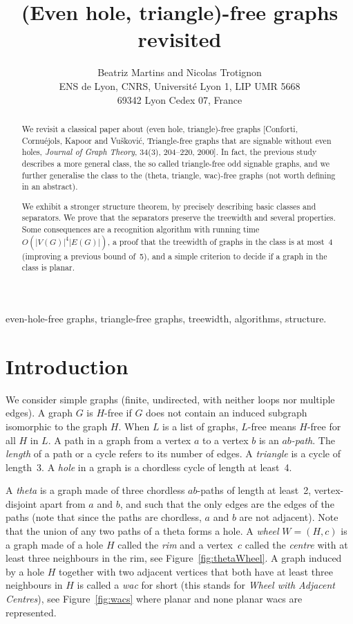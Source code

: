 \documentclass[11pt]{article}
\title{(Even hole, triangle)-free graphs revisited}
\author{Beatriz Martins and Nicolas Trotignon%
\\{ENS de Lyon, CNRS, Université Lyon 1, LIP UMR 5668\\69342 Lyon Cedex 07, France}}
\begin{document}
\maketitle

\begin{abstract}
 We revisit a classical paper about (even hole, triangle)-free graphs  [Conforti, Cornu\'ejols, Kapoor and Vu\v skovi\'c, Triangle-free graphs that are signable without even holes, \textit{Journal of Graph Theory}, 34(3), 204--220, 2000]. 
 In fact, the previous study describes a more general class, the so called triangle-free odd signable graphs, and we further generalise the class to the (theta, triangle, wac)-free graphs (not worth defining in an abstract).  
 
 We exhibit a stronger structure theorem, by precisely describing basic classes and separators.  We prove that the separators preserve the treewidth and several properties.  
 Some consequences are a recognition algorithm with running time $O(|V(G)|^4|E(G)|)$, a proof that  the treewidth of graphs in the class is at most~4 (improving a previous bound of~5), and a simple criterion to decide if a graph in the class is planar. 
\end{abstract}


 even-hole-free graphs, triangle-free graphs, treewidth, algorithms, structure.


\section{Introduction}
\label{sec:intro}

We consider simple graphs (finite, undirected, with neither loops nor multiple edges). A graph $G$ is $H$-free if $G$ does not contain an induced subgraph isomorphic to the graph $H$.  When $L$ is a list of graphs, $L$-free means $H$-free for all $H$ in $L$.  A path in a graph from a vertex $a$ to a vertex $b$ is an \emph{$ab$-path}. The \emph{length} of a path or a cycle refers to its number of edges. A \emph{triangle} is a cycle of length~3. A \emph{hole} in a graph is a chordless cycle of length at least~4. 

A \emph{theta} is a graph made of three chordless $ab$-paths of length at least~2, vertex-disjoint apart from $a$ and $b$, and such that the only edges are the edges of the paths (note that since the paths are chordless, $a$ and $b$ are not adjacent).  
Note that the union of any two paths of a theta forms a hole. 
A \emph{wheel} $W = (H, c)$ is a graph made of a hole $H$ called the
\emph{rim} and a vertex~$c$ called the \emph{centre} with at least
three neighbours in the rim, see Figure~\ref{fig:thetaWheel}.  
A graph induced by a hole $H$ together with two adjacent vertices that both have at least three neighbours in $H$ is called a \emph{wac} for short (this stands for \emph{Wheel with Adjacent Centres}), see Figure~\ref{fig:wacs} where planar and none planar wacs are represented. 
\end{document}
